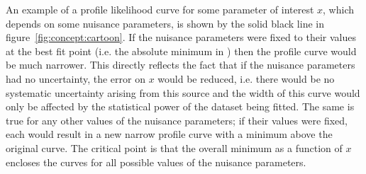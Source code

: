 An example of a profile likelihood curve for some parameter of interest $x$,
which depends on some nuisance parameters,
is shown by the solid black line in figure~\ref{fig:concept:cartoon}. If the
nuisance parameters were fixed to their values at the best fit point (i.e. the
absolute minimum in \nll) then the profile \nll curve would be much narrower.
This directly reflects the fact that
if the nuisance parameters had no uncertainty,
the error on $x$ would be reduced, i.e. there would be no systematic
uncertainty arising from this source and the width of this curve would only
be affected by the statistical power of the dataset being fitted.
The same is true for any other values of the nuisance parameters; if their values
were fixed, each would result in a new narrow profile curve with a minimum above the original
curve. The critical point is that the overall minimum as a function
of $x$ encloses the curves for all possible values of the nuisance
parameters.

